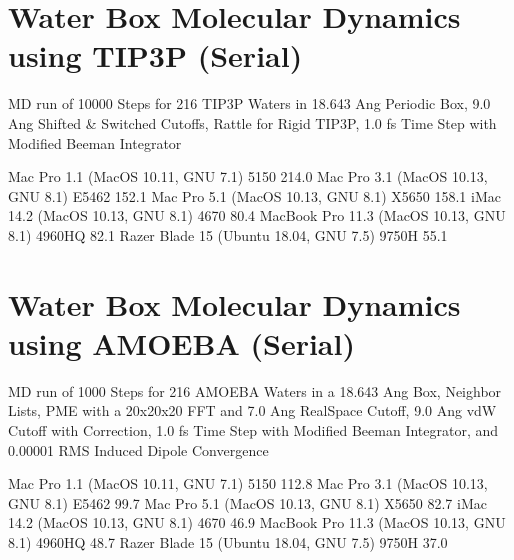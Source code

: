 \documentclass[letterpaper,11pt,english]{sphinxmanual}
\begin{document}
\section{Water Box Molecular Dynamics using TIP3P (Serial)}
\label{\detokenize{text/benchmarks:water-box-molecular-dynamics-using-tip3p-serial}}
MD run of 10000 Steps for 216 TIP3P Waters in 18.643 Ang Periodic Box, 9.0 Ang Shifted \& Switched Cutoffs, Rattle for Rigid TIP3P, 1.0 fs Time Step with Modified Beeman Integrator


\begin{sphinxVerbatim}[commandchars=\\\{\}]
Mac Pro 1.1 (MacOS 10.11, GNU 7.1)             5150               214.0
Mac Pro 3.1 (MacOS 10.13, GNU 8.1)            E5462               152.1
Mac Pro 5.1 (MacOS 10.13, GNU 8.1)            X5650               158.1
iMac 14.2 (MacOS 10.13, GNU 8.1)               4670                80.4
MacBook Pro 11.3 (MacOS 10.13, GNU 8.1)      4960HQ                82.1
Razer Blade 15 (Ubuntu 18.04, GNU 7.5)        9750H                55.1
\end{sphinxVerbatim}


\section{Water Box Molecular Dynamics using AMOEBA (Serial)}
\label{\detokenize{text/benchmarks:water-box-molecular-dynamics-using-amoeba-serial}}
MD run of 1000 Steps for 216 AMOEBA Waters in a 18.643 Ang Box, Neighbor Lists, PME with a 20x20x20 FFT and 7.0 Ang Real\sphinxhyphen{}Space Cutoff, 9.0 Ang vdW Cutoff with Correction, 1.0 fs Time Step with Modified Beeman Integrator, and 0.00001 RMS Induced Dipole Convergence


\begin{sphinxVerbatim}[commandchars=\\\{\}]
Mac Pro 1.1 (MacOS 10.11, GNU 7.1)             5150               112.8
Mac Pro 3.1 (MacOS 10.13, GNU 8.1)            E5462                99.7
Mac Pro 5.1 (MacOS 10.13, GNU 8.1)            X5650                82.7
iMac 14.2 (MacOS 10.13, GNU 8.1)               4670                46.9
MacBook Pro 11.3 (MacOS 10.13, GNU 8.1)      4960HQ                48.7
Razer Blade 15 (Ubuntu 18.04, GNU 7.5)        9750H                37.0
\end{sphinxVerbatim}
\end{document}
